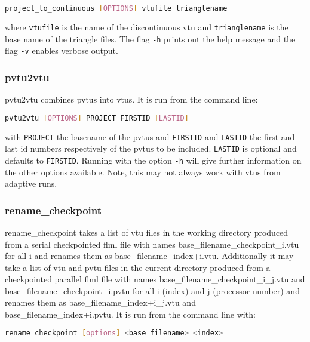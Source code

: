 \begin{lstlisting}[language = Bash]
project_to_continuous [OPTIONS] vtufile trianglename
\end{lstlisting}

where \lstinline[language = Bash]+vtufile+ is the name of the discontinuous vtu and \lstinline[language = Bash]+trianglename+ is the base name of the triangle files. The flag \lstinline[language = Bash]+-h+ prints out the help message and the flag \lstinline[language = Bash]+-v+ enables verbose output.


\subsubsection{pvtu2vtu}
\label{sect:pvtu2vtu}
pvtu2vtu combines pvtus into vtus. It is run from the command line:
\begin{lstlisting}[language = Bash]
pvtu2vtu [OPTIONS] PROJECT FIRSTID [LASTID]
\end{lstlisting} 
with \lstinline[language = Bash]+PROJECT+ the basename of the pvtus and \lstinline[language = Bash]+FIRSTID+ and \lstinline[language = Bash]+LASTID+ the first and last id numbers respectively of the pvtus to be included. \lstinline[language = Bash]+LASTID+ is optional and defaults to \lstinline[language = Bash]+FIRSTID+. Running with the option \lstinline[language = Bash]+-h+ will give further information on the other options available. Note, this may not always work with vtus from adaptive runs.


\subsubsection{rename\_checkpoint}
\label{sect:rename_checkpoint}
rename\_checkpoint takes a list of vtu files in the working directory produced from a serial checkpointed flml file with names base\_filename\_checkpoint\_i.vtu for all i and renames them as base\_filename\_index+i.vtu. Additionally it may take a list of
vtu and pvtu files in the current directory produced from a checkpointed parallel flml file with names base\_filename\_checkpoint\_i\_j.vtu and base\_filename\_checkpoint\_i.pvtu for all i (index) and j (processor number) and renames them as base\_filename\_index+i\_j.vtu and base\_filename\_index+i.pvtu. It is run from the command line with:
\begin{lstlisting}[language = Bash]
rename_checkpoint [options] <base_filename> <index>
\end{lstlisting}


